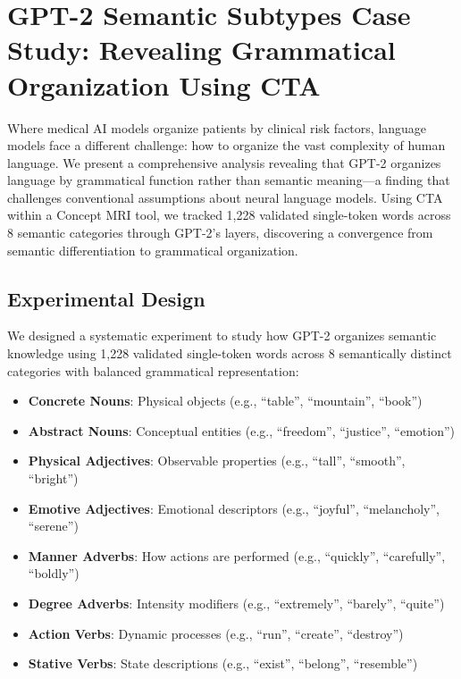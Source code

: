\section{GPT-2 Semantic Subtypes Case Study: Revealing Grammatical Organization Using CTA}

Where medical AI models organize patients by clinical risk factors, language models face a different challenge: how to organize the vast complexity of human language. We present a comprehensive analysis revealing that GPT-2 organizes language by grammatical function rather than semantic meaning—a finding that challenges conventional assumptions about neural language models. Using CTA within a Concept MRI tool, we tracked 1,228 validated single-token words across 8 semantic categories through GPT-2's layers, discovering a convergence from semantic differentiation to grammatical organization.

\subsection{Experimental Design}

We designed a systematic experiment to study how GPT-2 organizes semantic knowledge using 1,228 validated single-token words across 8 semantically distinct categories with balanced grammatical representation:

\begin{itemize}
    \item \textbf{Concrete Nouns}: Physical objects (e.g., ``table'', ``mountain'', ``book'')
    \item \textbf{Abstract Nouns}: Conceptual entities (e.g., ``freedom'', ``justice'', ``emotion'')
    \item \textbf{Physical Adjectives}: Observable properties (e.g., ``tall'', ``smooth'', ``bright'')
    \item \textbf{Emotive Adjectives}: Emotional descriptors (e.g., ``joyful'', ``melancholy'', ``serene'')
    \item \textbf{Manner Adverbs}: How actions are performed (e.g., ``quickly'', ``carefully'', ``boldly'')
    \item \textbf{Degree Adverbs}: Intensity modifiers (e.g., ``extremely'', ``barely'', ``quite'')
    \item \textbf{Action Verbs}: Dynamic processes (e.g., ``run'', ``create'', ``destroy'')
    \item \textbf{Stative Verbs}: State descriptions (e.g., ``exist'', ``belong'', ``resemble'')
\end{itemize}

